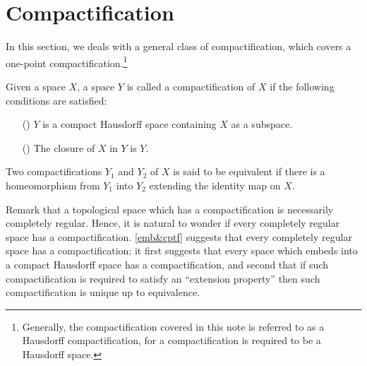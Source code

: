 \section{Compactification}

In this section, we deals with a general class of compactification, which covers a one-point compactification.\footnote{Generally, the compactification covered in this note is referred to as a Hausdorff compactification, for a compactification is required to be a Hausdorff space.}
\begin{defi}[Compactification]
    Given a space $X$, a space $Y$ is called a compactification of $X$ if the following conditions are satisfied:
    \begin{enumerate}
        \item[(\romannumeral 1)]
        {
            $Y$ is a compact Hausdorff space containing $X$ as a subspace.
        }
        \item[(\romannumeral 2)]
        {
            The closure of $X$ in $Y$ is $Y$.
        }
    \end{enumerate}
    Two compactifications $Y_1$ and $Y_2$ of $X$ is said to be equivalent if there is a homeomorphism from $Y_1$ into $Y_2$ extending the identity map on $X$.
\end{defi}
Remark that a topological space which has a compactification is necessarily completely regular.
Hence, it is natural to wonder if every completely regular space has a compactification.
\cref{emb&cptf} suggests that every completely regular space has a compactification; it first suggests that every space which embeds into a compact Hausdorff space has a compactification, and second that if such compactification is required to satisfy an ``extension property'' then such compactification is unique up to equivalence.

